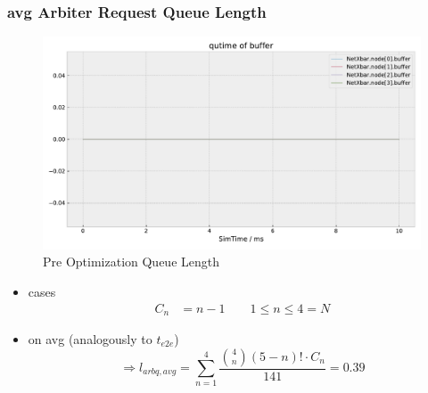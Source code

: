 \documentclass[]{scrartcl}
\begin{document}
    \subsubsection{avg Arbiter Request Queue Length}
    \begin{figure}[ht]
        \centering
        \includegraphics[width=\columnwidth, page=4]{../../python/results/preopt-General-0}
        \caption{Pre Optimization Queue Length}%
        \label{fig:postopt-General-0}
    \end{figure}
        \begin{itemize}
            \item cases
                \begin{align}
                    C_n &= n-1 \qquad 1\leq n\leq4=N
                \end{align}
            \item on avg (analogously to $t_{e2e}$)
                \begin{equation}
                    \Rightarrow l_{arbq,avg} = \sum_{n=1}^4 \frac{\binom{4}{n}\left( 5-n \right)! \cdot C_n }{141} = 0.39
                \end{equation}
        \end{itemize}
\end{document}
